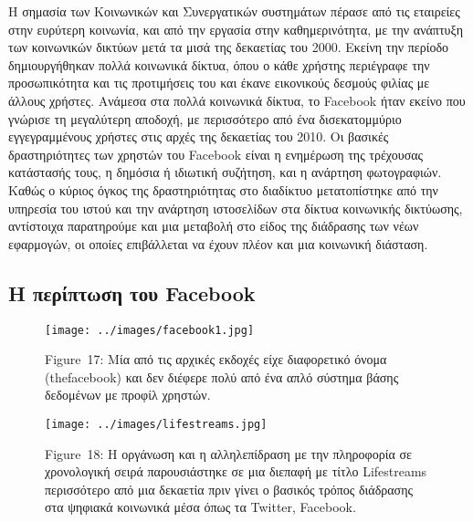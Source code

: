 \documentclass[
]{article}
\begin{document}
Η σημασία των Κοινωνικών και Συνεργατικών συστημάτων πέρασε από τις
εταιρείες στην ευρύτερη κοινωνία, και από την εργασία στην
καθημερινότητα, με την ανάπτυξη των κοινωνικών δικτύων μετά τα μισά της
δεκαετίας του 2000. Εκείνη την περίοδο δημιουργήθηκαν πολλά κοινωνικά
δίκτυα, όπου ο κάθε χρήστης περιέγραφε την προσωπικότητα και τις
προτιμήσεις του και έκανε εικονικούς δεσμούς φιλίας με άλλους χρήστες.
Ανάμεσα στα πολλά κοινωνικά δίκτυα, το Facebook ήταν εκείνο που γνώρισε
τη μεγαλύτερη αποδοχή, με περισσότερο από ένα δισεκατομμύριο
εγγεγραμμένους χρήστες στις αρχές της δεκαετίας του 2010. Οι βασικές
δραστηριότητες των χρηστών του Facebook είναι η ενημέρωση της τρέχουσας
κατάστασής τους, η δημόσια ή ιδιωτική συζήτηση, και η ανάρτηση
φωτογραφιών. Καθώς ο κύριος όγκος της δραστηριότητας στο διαδίκτυο
μετατοπίστηκε από την υπηρεσία του ιστού και την ανάρτηση ιστοσελίδων
στα δίκτυα κοινωνικής δικτύωσης, αντίστοιχα παρατηρούμε και μια μεταβολή
στο είδος της διάδρασης των νέων εφαρμογών, οι οποίες επιβάλλεται να
έχουν πλέον και μια κοινωνική διάσταση.

\hypertarget{ux3b7-ux3c0ux3b5ux3c1ux3afux3c0ux3c4ux3c9ux3c3ux3b7-ux3c4ux3bfux3c5-facebook}{%
\subsection{Η περίπτωση του
Facebook}\label{ux3b7-ux3c0ux3b5ux3c1ux3afux3c0ux3c4ux3c9ux3c3ux3b7-ux3c4ux3bfux3c5-facebook}}

\leavevmode{}%
\begin{figure}
\hypertarget{fig:facebook1}{%
\centering
\texttt{[image: ../images/facebook1.jpg]}
\caption{Figure~17: Μία από τις αρχικές εκδοχές είχε διαφορετικό όνομα
(thefacebook) και δεν διέφερε πολύ από ένα απλό σύστημα βάσης δεδομένων
με προφίλ χρηστών.}\label{fig:facebook1}
}
\end{figure}

\leavevmode{}%
\begin{figure}
\hypertarget{fig:lifestreams}{%
\centering
\texttt{[image: ../images/lifestreams.jpg]}
\caption{Figure~18: Η οργάνωση και η αλληλεπίδραση με την πληροφορία σε
χρονολογική σειρά παρουσιάστηκε σε μια διεπαφή με τίτλο Lifestreams
περισσότερο από μια δεκαετία πριν γίνει ο βασικός τρόπος διάδρασης στα
ψηφιακά κοινωνικά μέσα όπως τα Twitter,
Facebook.}\label{fig:lifestreams}
}
\end{figure}
\end{document}
